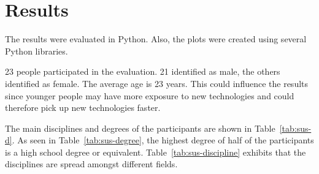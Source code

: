 \section{Results}\label{section:eval-results}


\newcommand{\participantsCount}{23}
\newcommand{\participantsMale}{21}
\newcommand{\participantsAge}{23}

\newcommand{\evalExpMvAvgPoses}{2.83}
\newcommand{\evalExpMvStdPoses}{1.94}
\newcommand{\evalExpMvParticipants}{\participantsCount}

\newcommand{\kammAvgHits}{36.23/60}
\newcommand{\kammAvgStd}{6.87/60}
\newcommand{\youngAvgHits}{0.85}
\newcommand{\youngAvgStd}{-}
\newcommand{\oursAvgHits}{26.13/30}
\newcommand{\oursAvgStd}{5.52/30}

\newcommand{\evalExpMvSusScore}{83.04}
\newcommand{\evalExpMvSusGrade}{B}
\newcommand{\evalExpMvSusAdj}{\enquote{Good}}

\newcommand{\evalExpLpSusScore}{91.41}
\newcommand{\evalExpLpSusGrade}{A}
\newcommand{\evalExpLpSusAdj}{\enquote{Excellent}}

\newcommand{\evalExpVkSusScore}{71.63}
\newcommand{\evalExpVkSusGrade}{C}
\newcommand{\evalExpVkSusAdj}{\enquote{Ok}}

\newcommand{\participantsFemale}{\pgfmathparse{\participantsCount - \participantsMale}\pgfmathprintnumber[fixed, precision=2]{\pgfmathresult}}%

The results were evaluated in Python. Also, the plots were created using several Python libraries.

\participantsCount{} people participated in the evaluation. \participantsMale{} identified as male, the others identified as female. The average age is \participantsAge{} years. This could influence the results since younger people may have more exposure to new technologies and could therefore pick up new technologies faster.

The main disciplines and degrees of the participants are shown in Table~\ref{tab:sus-d}. As seen in Table~\ref{tab:sus-degree}, the highest degree of half of the participants is a high school degree or equivalent.
Table~\ref{tab:sus-discipline} exhibits that the disciplines are spread amongst different fields.


